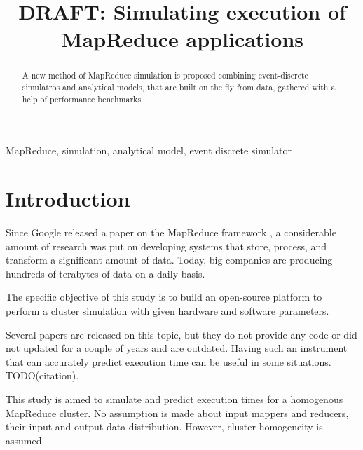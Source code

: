 \documentclass[conference]{IEEEtran} \IEEEoverridecommandlockouts
\begin{document}
 \title{DRAFT: Simulating execution of MapReduce applications}

    \author{ 
    }

    \maketitle

    \begin{abstract} 
        A new method of MapReduce simulation is proposed combining event-discrete simulatros and analytical models, that are built on the fly from data, gathered with a help of performance benchmarks.
    \end{abstract}

    \begin{IEEEkeywords} 
        MapReduce, simulation, analytical model, event discrete simulator
    \end{IEEEkeywords}

    \section{Introduction} 


    Since Google released a paper on the MapReduce framework \cite{google_mapreduce}, a considerable amount of research was put on developing systems that store, process, and transform a significant amount of data. Today, big companies are producing hundreds of terabytes of data on a daily basis. 



    The specific objective of this study is to build an open-source platform to perform a cluster simulation with given hardware and software parameters.

    Several papers are released on this topic, but they do not provide any code or did not updated for a couple of years and are outdated. Having such an instrument that can accurately predict execution time can be useful in some situations. TODO(citation). 

    This study is aimed to simulate and predict execution times for a homogenous MapReduce cluster. No assumption is made about input mappers and reducers, their input and output data distribution. However, cluster homogeneity is assumed.
\end{document}
